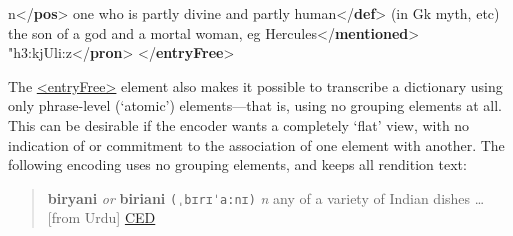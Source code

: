 \begin{shaded}
\mbox{}\newline 
{}\mbox{}\newline 
\hspace*{1em}n{</\textbf{pos}>}\mbox{}\newline 
{}\mbox{}\newline 
{}one who is partly divine and partly human{</\textbf{def}>}\mbox{}\newline 
{}(in Gk myth, etc) the son of a god and a mortal woman, eg\mbox{}\newline 
{}Hercules{</\textbf{mentioned}>}\mbox{}\newline 
{}\mbox{}\newline 
{}"h3:kjUli:z{</\textbf{pron}>}\mbox{}\newline 
{</\textbf{entryFree}>}\end{shaded}\egroup\par \par
The \hyperref[TEI.entryFree]{<entryFree>} element also makes it possible to transcribe a dictionary using only phrase-level (‘atomic’) elements—that is, using no grouping elements at all. This can be desirable if the encoder wants a completely ‘flat’ view, with no indication of or commitment to the association of one element with another. The following encoding uses no grouping elements, and keeps all rendition text:
\begin{quote}{\bfseries biryani} {\itshape or} {\bfseries biriani} \texttt{(ˌbɪrɪˈa:nɪ)} {\itshape n} any of a variety of Indian dishes … [from Urdu] \hyperref[DIC-CED]{CED}\end{quote}
